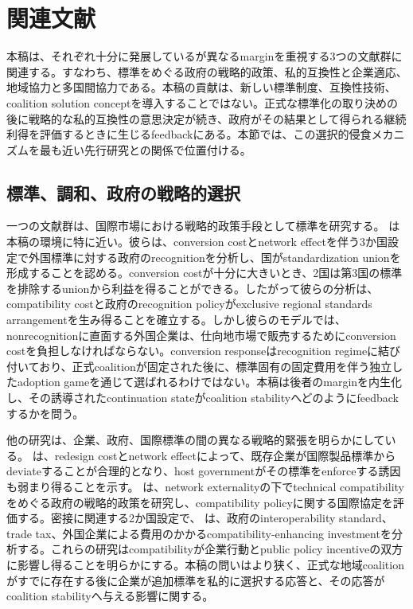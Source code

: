 \section{関連文献}
\label{sec:literature}

本稿は、それぞれ十分に発展しているが異なるmarginを重視する3つの文献群に関連する。すなわち、標準をめぐる政府の戦略的政策、私的互換性と企業適応、地域協力と多国間協力である。本稿の貢献は、新しい標準制度、互換性技術、coalition solution conceptを導入することではない。正式な標準化の取り決めの後に戦略的な私的互換性の意思決定が続き、政府がその結果として得られる継続利得を評価するときに生じるfeedbackにある。本節では、この選択的侵食メカニズムを最も近い先行研究との関係で位置付ける。

\subsection{標準、調和、政府の戦略的選択}
\label{subsec:lit-government-standards}

一つの文献群は、国際市場における戦略的政策手段として標準を研究する。\citet{gandalShy2001} は本稿の環境に特に近い。彼らは、conversion costとnetwork effectを伴う3か国設定で外国標準に対する政府のrecognitionを分析し、国がstandardization unionを形成することを認める。conversion costが十分に大きいとき、2国は第3国の標準を排除するunionから利益を得ることができる。したがって彼らの分析は、compatibility costと政府のrecognition policyがexclusive regional standards arrangementを生み得ることを確立する。しかし彼らのモデルでは、nonrecognitionに直面する外国企業は、仕向地市場で販売するためにconversion costを負担しなければならない。conversion responseはrecognition regimeに結び付いており、正式coalitionが固定された後に、標準固有の固定費用を伴う独立したadoption gameを通じて選ばれるわけではない。本稿は後者のmarginを内生化し、その誘導されたcontinuation stateがcoalition stabilityへどのようにfeedbackするかを問う。

他の研究は、企業、政府、国際標準の間の異なる戦略的緊張を明らかにしている。\citet{barrettYang2001} は、redesign costとnetwork effectによって、既存企業が国際製品標準からdeviateすることが合理的となり、host governmentがその標準をenforceする誘因も弱まり得ることを示す。\citet{klimenko2009} は、network externalityの下でtechnical compatibilityをめぐる政府の戦略的政策を研究し、compatibility policyに関する国際協定を評価する。密接に関連する2か国設定で、\citet{klimenkoInteroperability2009} は、政府のinteroperability standard、trade tax、外国企業による費用のかかるcompatibility-enhancing investmentを分析する。これらの研究はcompatibilityが企業行動とpublic policy incentiveの双方に影響し得ることを明らかにする。本稿の問いはより狭く、正式な地域coalitionがすでに存在する後に企業が追加標準を私的に選択する応答と、その応答がcoalition stabilityへ与える影響に関する。

